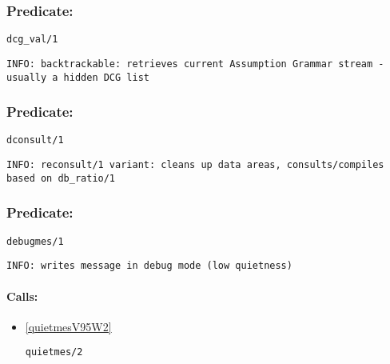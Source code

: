 \subsubsection{Predicate:} \label{dcgV95WvalV95W1}

\begin{verbatim}
dcg_val/1
\end{verbatim}

{\small \begin{verbatim}
INFO: backtrackable: retrieves current Assumption Grammar stream - usually a hidden DCG list

\end{verbatim}}

\subsubsection{Predicate:} \label{dconsultV95W1}

\begin{verbatim}
dconsult/1
\end{verbatim}

{\small \begin{verbatim}
INFO: reconsult/1 variant: cleans up data areas, consults/compiles based on db_ratio/1

\end{verbatim}}

\subsubsection{Predicate:} \label{debugmesV95W1}

\begin{verbatim}
debugmes/1
\end{verbatim}

{\small \begin{verbatim}
INFO: writes message in debug mode (low quietness)

\end{verbatim}}
\paragraph{Calls:} 
\begin{itemize}
\item \ref{quietmesV95W2} 
\begin{verbatim}
quietmes/2
\end{verbatim}

\end{itemize}
